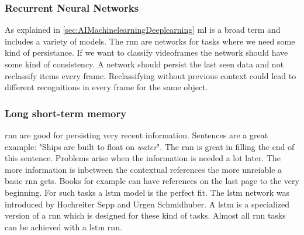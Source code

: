 \documentclass[10pt,a4paper]{article}
\begin{document}
\subsubsection{Recurrent Neural Networks}
As explained in \autoref{sec:AIMachinelearningDeeplearning} \gls{ml} is a broad term and includes a variety of models. The \gls{rnn} are networks for tasks where we need some kind of persistance. If we want to classify videoframes the network should have some kind of consistency.\cite{Olah2015} A network should persist the last seen data and not reclassify items every frame. Reclassifying without previous context could lead to different recognitions in every frame for the same object.

\subsubsection{Long short-term memory}
\gls{rnn} are good for persisting very recent information. Sentences are a great example: "Ships are built to float on \textit{water}". The \gls{rnn} is great in filling the end of this sentence. Problems arise when the information is needed a lot later. The more information is inbetween the contextual references the more unreiable a basic \gls{rnn} gets. Books for example can have references on the last page to the very beginning. For such tasks a \gls{lstm} model is the perfect fit. The \gls{lstm} network was introduced by Hochreiter Sepp and Urgen Schmidhuber\citep{Hochreiter1997}. A \gls{lstm} is a specialized version of a \gls{rnn} which is designed for these kind of tasks. Almost all \gls{rnn} tasks can be achieved with a \gls{lstm} \gls{rnn}\cite{Olah2015}.
\end{document}
